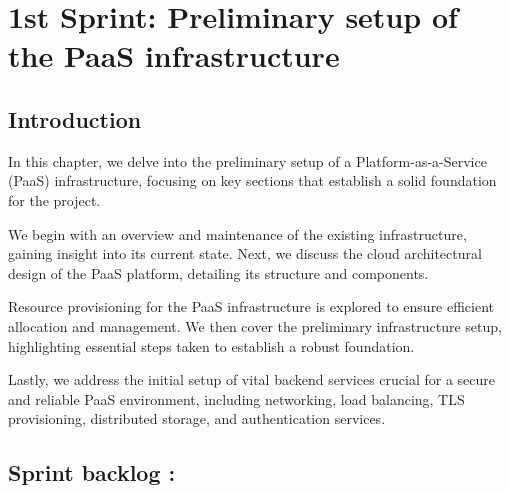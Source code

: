 \graphicspath{{./assets/}}
\setcounter{mtc}{2}
\chapter{1st Sprint: Preliminary setup of the PaaS infrastructure  }
\minitoc
\newpage

\section{Introduction}
In this chapter, we delve into the preliminary setup of a Platform-as-a-Service (PaaS) infrastructure, focusing on key sections that establish a solid foundation for the project.

We begin with an overview and maintenance of the existing infrastructure, gaining insight into its current state. Next, we discuss the cloud architectural design of the PaaS platform, detailing its structure and components.

Resource provisioning for the PaaS infrastructure is explored to ensure efficient allocation and management. We then cover the preliminary infrastructure setup, highlighting essential steps taken to establish a robust foundation.

Lastly, we address the initial setup of vital backend services crucial for a secure and reliable PaaS environment, including networking, load balancing, TLS provisioning, distributed storage, and authentication services.

\section{Sprint backlog :}

